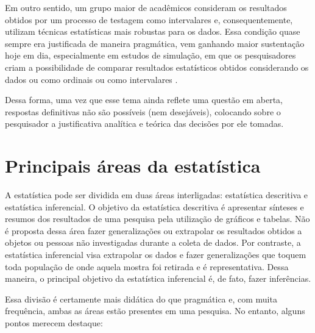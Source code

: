 \documentclass[
]{book}
\begin{document}
Em outro sentido, um grupo maior de acadêmicos consideram os resultados obtidos por um processo de testagem como intervalares e, consequentemente, utilizam técnicas estatísticas mais robustas para os dados. Essa condição quase sempre era justificada de maneira pragmática, vem ganhando maior sustentação hoje em dia, especialmente em estudos de simulação, em que os pesquisadores criam a possibilidade de comparar resultados estatísticos obtidos considerando os dados ou como ordinais ou como intervalares \citep{Wu2017}.

Dessa forma, uma vez que esse tema ainda reflete uma questão em aberta, respostas definitivas não são possíveis (nem desejáveis), colocando sobre o pesquisador a justificativa analítica e teórica das decisões por ele tomadas.

\hypertarget{principais-uxe1reas-da-estatuxedstica}{%
\section{Principais áreas da estatística}\label{principais-uxe1reas-da-estatuxedstica}}

A estatística pode ser dividida em duas áreas interligadas: estatística descritiva e estatística inferencial. O objetivo da estatística descritiva é apresentar sínteses e resumos dos resultados de uma pesquisa pela utilização de gráficos e tabelas. Não é proposta dessa área fazer generalizações ou extrapolar os resultados obtidos a objetos ou pessoas não investigadas durante a coleta de dados. Por contraste, a estatística inferencial visa extrapolar os dados e fazer generalizações que toquem toda população de onde aquela mostra foi retirada e é representativa. Dessa maneira, o principal objetivo da estatística inferencial é, de fato, fazer inferências.

Essa divisão é certamente mais didática do que pragmática e, com muita frequência, ambas as áreas estão presentes em uma pesquisa. No entanto, alguns pontos merecem destaque:
\end{document}
